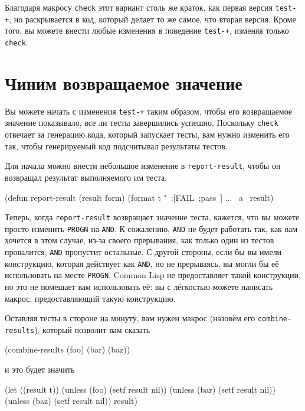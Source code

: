 Благодаря макросу \lstinline{check} этот вариант столь же краток, как первая версия
\lstinline{test-+}, но раскрывается в код, который делает то же самое, что вторая версия. Кроме
того, вы можете внести любые изменения в поведение \lstinline{test-+}, изменяя только
\lstinline{check}.

\section{Чиним возвращаемое значение}

Вы можете начать с изменения \lstinline{test-+} таким образом, чтобы его возвращаемое
значение показывало, все ли тесты завершились успешно. Поскольку \lstinline{check}
отвечает за генерацию кода, который запускает тесты, вам нужно изменить его так, чтобы
генерируемый код подсчитывал результаты тестов.

Для начала можно внести небольшое изменение в \lstinline{report-result}, чтобы он возвращал
результат выполняемого им теста.

\begin{myverb}
(defun report-result (result form)
  (format t "~:[FAIL~;pass~] ... ~a~%
  result)
\end{myverb}

Теперь, когда \lstinline{report-result} возвращает значение теста, кажется, что вы можете
прос\-то изменить \lstinline{PROGN} на \lstinline{AND}. К сожалению, \lstinline{AND} не
будет работать так, как вам хочется в этом случае, из-за своего прерывания, как только
один из тестов провалится, \lstinline{AND} про\-пус\-тит остальные. С другой стороны, если бы
вы имели конструкцию, которая действует как \lstinline{AND}, но не прерываясь, вы могли бы
её использовать на месте \lstinline{PROGN}. Common Lisp не предоставляет такой
конструкции, но это не помешает вам использовать её: вы с лёгкостью можете написать
макрос, предоставляющий такую конструкцию.

Оставляя тесты в стороне на минуту, вам нужен макрос (назовём его \lstinline{combine-results}),
который позволит вам сказать

\begin{myverb}
(combine-results
  (foo)
  (bar)
  (baz))
\end{myverb}

\noindent{}и это будет значить

\begin{myverb}
(let ((result t))
  (unless (foo) (setf result nil))
  (unless (bar) (setf result nil))
  (unless (baz) (setf result nil))
  result)
\end{myverb}

